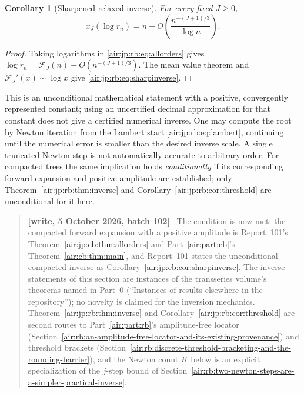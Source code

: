 \documentclass[11pt,letterpaper]{article}
\numberwithin{equation}{section}
\newtheorem{corollary}[theorem]{Corollary}
\theoremstyle{remark}
\newenvironment{writenotejp}{\par\smallskip\begin{quote}\small\textbf{[write, 5 October 2026, batch 102]}\ }{\end{quote}\smallskip}
\begin{document}
\begin{corollary}[Sharpened relaxed inverse]\label{air:jp:rb:cor:sharpinverse}
For every fixed $J\ge0$,
\begin{equation}\label{air:jp:rb:eq:sharpinverse}
 x_J(\log r_n)=n+O\!\left(\frac{n^{-(J+1)/3}}{\log n}\right).
\end{equation}
\end{corollary}
\begin{proof}
Taking logarithms in \eqref{air:jp:rb:eq:allorders} gives
$\log r_n=\mathcal F_J(n)+O(n^{-(J+1)/3})$. The mean value theorem and $\mathcal F_J'(x)\sim\log x$ give \eqref{air:jp:rb:eq:sharpinverse}.
\end{proof}
This is an unconditional mathematical statement with a positive, convergently represented constant; using an uncertified decimal approximation for that constant does not give a certified numerical inverse. One may compute the root by Newton iteration from the Lambert start \eqref{air:jp:rb:eq:lambert}, continuing until the numerical error is smaller than the desired inverse scale. A single truncated Newton step is not automatically accurate to arbitrary order. For compacted trees the same implication holds \emph{conditionally} if its corresponding forward expansion and positive amplitude are established; only Theorem~\ref{air:jp:rb:thm:inverse} and Corollary~\ref{air:jp:rb:cor:threshold} are unconditional for it here.
\begin{writenotejp}
The condition is now met: the compacted forward expansion with a positive amplitude is Report~101's Theorem~\ref{air:jp:cb:thm:allorders} and Part~\ref{air:part:cb}'s Theorem~\ref{air:cb:thm:main}, and Report~101 states the unconditional compacted inverse as Corollary~\ref{air:jp:cb:cor:sharpinverse}. The inverse statements of this section are instances of the transseries volume's theorems named in Part~0 (``Instances of results elsewhere in the repository''); no novelty is claimed for the inversion mechanics. Theorem~\ref{air:jp:rb:thm:inverse} and Corollary~\ref{air:jp:rb:cor:threshold} are second routes to Part~\ref{air:part:rb}'s amplitude-free locator (Section~\ref{air:rb:an-amplitude-free-locator-and-its-existing-provenance}) and threshold brackets (Section~\ref{air:rb:discrete-threshold-bracketing-and-the-rounding-barrier}), and the Newton count $K$ below is an explicit specialization of the $j$-step bound of Section~\ref{air:rb:two-newton-steps-are-a-simpler-practical-inverse}.
\end{writenotejp}
\end{document}
